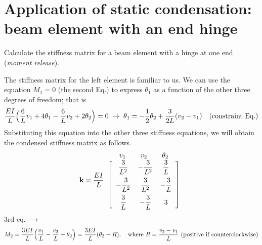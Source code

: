 \section{Application of static condensation: beam element with an end hinge}
\label{sec:end-hinge}
Calculate the stiffness matrix for a beam element with a hinge at one end (\emph{moment release}).
\begin{fig}
  
\end{fig}
The stiffness matrix for the left element is familiar to us. We can use the equation $M_1 = 0$ (the second Eq.) to express $\theta_1$ as a function of the other three degrees of freedom; that is
\begin{equation}
  \frac{EI}{L}\Bigl(\frac6L v_1 + 4\theta_1 - \frac6L v_2 + 2\theta_2\Bigr) = 0 \;\rightarrow\; \theta_1 = -\frac12\theta_2 + \frac{3}{2L}(v_2 - v_1)\quad\text{(constraint Eq.)}
\end{equation}
Substituting this equation into the other three stiffness equations, we will obtain the condensed stiffness matrix as follows.
\begin{equation}
  \mathbf{k} = \frac{EI}{L}
  \begin{array}{c}
    \begin{array}{ccc} \;\;v_1\;\; & \;\;v_2\;\; & \;\;\theta_2\;\; \end{array}\\
    \left[\begin{array}{ccc}
      \dfrac{3}{L^2} & -\dfrac{3}{L^2} & \dfrac3L\\[8pt]
      -\dfrac{3}{L^2} & \dfrac{3}{L^2} & -\dfrac3L\\[8pt]
      \dfrac3L & -\dfrac3L & 3
    \end{array}\right]
  \end{array}
\end{equation}
3rd eq.\ $\rightarrow$
\begin{equation*}
  M_2 = \frac{3EI}{L}\Bigl(\frac{v_1}{L} - \frac{v_2}{L} + \theta_2\Bigr) = \frac{3EI}{L}(\theta_2 - R),\quad
  \text{where } R = \frac{v_2-v_1}{L}\ \text{(positive if counterclockwise)}
\end{equation*}

